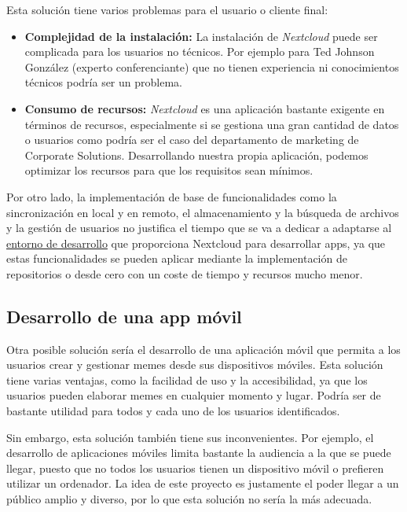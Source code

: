 Esta solución tiene varios problemas para el usuario o cliente final: 

\begin{itemize}
    \item \textbf{Complejidad de la instalación:} La instalación de \textit{Nextcloud} puede ser complicada para los usuarios no técnicos. Por ejemplo para Ted Johnson González (experto conferenciante) que no tienen experiencia ni conocimientos técnicos podría ser un problema.
    \item \textbf{Consumo de recursos:} \textit{Nextcloud} es una aplicación bastante exigente en términos de recursos, especialmente si se gestiona una gran cantidad de datos o usuarios como podría ser el caso del departamento de marketing de Corporate Solutions. Desarrollando nuestra propia aplicación, podemos optimizar los recursos para que los requisitos sean mínimos.
\end{itemize}

Por otro lado, la implementación de base de funcionalidades como la sincronización en local y en remoto, el almacenamiento y la búsqueda de archivos y la gestión de usuarios no justifica el tiempo que se va a dedicar a adaptarse al \href{https://nextcloud.com/developer/}{entorno de desarrollo} que proporciona Nextcloud para desarrollar apps, ya que estas funcionalidades se pueden aplicar mediante la implementación de repositorios o desde cero con un coste de tiempo y recursos mucho menor. 

\subsection{Desarrollo de una app móvil}

Otra posible solución sería el desarrollo de una aplicación móvil que permita a los usuarios crear y gestionar memes desde sus dispositivos móviles. Esta solución tiene varias ventajas, como la facilidad de uso y la accesibilidad, ya que los usuarios pueden elaborar memes en cualquier momento y lugar. Podría ser de bastante utilidad para todos y cada uno de los usuarios identificados.

Sin embargo, esta solución también tiene sus inconvenientes. Por ejemplo, el desarrollo de aplicaciones móviles limita bastante la audiencia a la que se puede llegar, puesto que no todos los usuarios tienen un dispositivo móvil o prefieren utilizar un ordenador. La idea de este proyecto es justamente el poder llegar a un público amplio y diverso, por lo que esta solución no sería la más adecuada.

